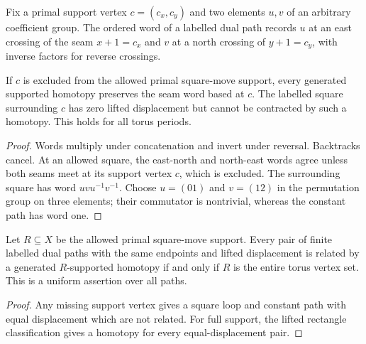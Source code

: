 \begin{definition}
    \label{def:peps_based_dual_seam_word}
    \leanok
    Fix a primal support vertex $c=(c_x,c_y)$ and two elements $u,v$ of an
    arbitrary coefficient group. The ordered word of a labelled dual path records
    $u$ at an east crossing of the seam $x+1=c_x$ and $v$ at a north crossing
    of $y+1=c_y$, with inverse factors for reverse crossings.
\end{definition}

\begin{lemma}
    \label{lem:peps_missing_support_obstruction}
    \leanok
    If $c$ is excluded from the allowed primal square-move support, every
    generated supported homotopy preserves the seam word based at $c$.
    The labelled square surrounding $c$ has zero lifted displacement but
    cannot be contracted by such a homotopy. This holds for all torus periods.
\end{lemma}
\begin{proof}\leanok
    Words multiply under concatenation and invert under reversal.
    Backtracks cancel. At an allowed square, the east-north and north-east
    words agree unless both seams meet at its support vertex $c$, which is
    excluded. The surrounding square has word $uvu^{-1}v^{-1}$.
    Choose $u=(01)$ and $v=(12)$ in the permutation group on three elements;
    their commutator is nontrivial, whereas the constant path has word one.
\end{proof}

\begin{lemma}
    \label{lem:peps_uniform_displacement_support}
    \leanok
    Let $R\subseteq X$ be the allowed primal square-move support. Every pair of finite
    labelled dual paths with the same endpoints and lifted displacement is
    related by a generated $R$-supported homotopy if and only if $R$ is the
    entire torus vertex set. This is a uniform assertion over all paths.
\end{lemma}
\begin{proof}\leanok
    Any missing support vertex gives a square loop and constant path with
    equal displacement which are not related. For full support, the lifted
    rectangle classification gives a homotopy for every equal-displacement pair.
\end{proof}
